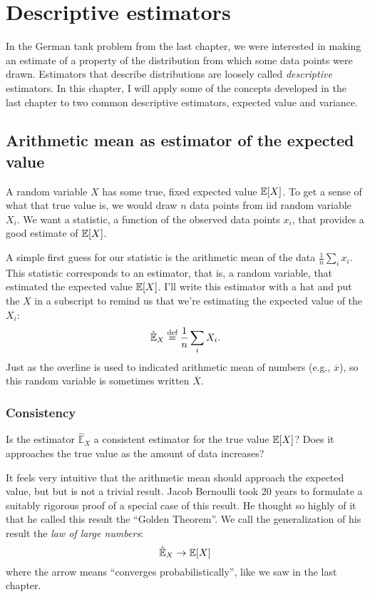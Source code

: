 
\chapter{Descriptive estimators}

In the German tank problem from the last chapter, we were interested in making
an estimate of a property of the distribution from which some data points were
drawn. Estimators that describe distributions are loosely called
\emph{descriptive} estimators. In this chapter, I will apply some of the
concepts developed in the last chapter to two common descriptive estimators,
expected value and variance.

\section{Arithmetic mean as estimator of the expected value}

A random variable $X$ has some true, fixed expected value $\mathbb{E}\!\left[{X}\right]$. To get
a sense of what that true value is, we would draw $n$ data points from iid random
variable $X_i$. We want a statistic, a function of the observed data points
$x_i$, that provides a good estimate of $\mathbb{E}\!\left[{X}\right]$.

A simple first guess for our statistic is the arithmetic mean of the data
$\tfrac{1}{n} \sum_i x_i$. This statistic corresponds to an estimator, that
is, a random variable, that estimated the expected value $\mathbb{E}\!\left[{X}\right]$. I'll
write this estimator with a hat and put the $X$ in a subscript to remind us
that we're estimating the expected value of the $X_i$:
\begin{equation}
\hat{\mathbb{E}}_X \stackrel{\text{def}}{=} \frac{1}{n} \sum_i X_i.
\end{equation}
Just as the overline is used to indicated arithmetic mean of numbers (e.g.,
$\overline{x}$), so this random variable is sometimes written $\overline{X}$.

\subsection{Consistency}

Is the estimator $\hat{\mathbb{E}}_X$ a consistent estimator for the true
value $\mathbb{E}\!\left[{X}\right]$? Does it approaches the true value as the amount of data
increases?

It feels very intuitive that the arithmetic mean should approach
the expected value, but but is not a trivial result. Jacob Bernoulli took 20
years to formulate a suitably rigorous proof of a special case of this result.
He thought so highly of it that he called this result the ``Golden Theorem''.
We call the generalization of his result the \emph{law of large numbers}:
\begin{equation}
\hat{\mathbb{E}}_X \to \mathbb{E}\!\left[{X}\right]
\end{equation}
where the arrow means ``converges probabilistically'', like we saw in the last
chapter.

